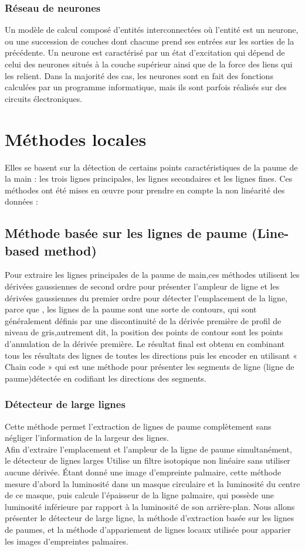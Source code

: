 \subsubsection{Réseau de neurones}
Un modèle de calcul composé d’entités interconnectées où l’entité est un neurone, ou une succession de couches dont chacune prend ses entrées sur les sorties de la précédente. Un neurone est caractérisé par un état d’excitation qui dépend de celui des neurones situés à la couche supérieur ainsi que de la force des liens qui les relient. Dans la majorité des cas, les neurones sont en fait des fonctions calculées par un programme informatique, mais ils sont parfois réalisés sur des circuits électroniques.
 
\section{Méthodes locales }
Elles se basent sur la détection de certains points caractéristiques de la paume de la main : les trois lignes principales, les lignes secondaires et les lignes fines. Ces méthodes ont été mises en œuvre pour prendre en compte la non linéarité des données :
\subsection{Méthode basée sur les lignes de paume (Line-based method)}
Pour extraire les lignes principales de la paume de main,ces méthodes utilisent les dérivées gaussiennes de second ordre pour présenter l’ampleur de ligne et les dérivées gaussiennes du premier ordre pour détecter l’emplacement de la ligne, parce que , les lignes de la paume sont une sorte de contours, qui sont généralement définis par une discontinuité de la dérivée première de profil de niveau de gris,autrement dit, la position des points de contour sont les points d’annulation de la dérivée première. Le résultat final est obtenu en combinant tous les résultats des lignes de toutes les directions puis les encoder en utilisant « Chain code » qui est une méthode pour présenter les segments de ligne (ligne de paume)détectée en codifiant les directions des segments.
\subsubsection{Détecteur de large lignes}
Cette méthode permet l’extraction de lignes de paume complètement sans négliger l’information de la largeur des lignes.
\\
Afin d’extraire l’emplacement et l’ampleur de la ligne de paume simultanément, le détecteur de lignes larges Utilise un filtre isotopique non linéaire sans utiliser aucune dérivée.
Étant donné une image d’empreinte palmaire, cette méthode mesure d’abord la luminosité dans un masque circulaire et la luminosité du centre de ce masque, puis calcule l’épaisseur de la ligne palmaire, qui possède une luminosité inférieure par rapport à la luminosité de son arrière-plan.
Nous allons présenter le détecteur de large ligne, la méthode d’extraction basée sur les lignes de paumes, et la méthode d’appariement de lignes locaux utilisée pour apparier les images d’empreintes palmaires.
